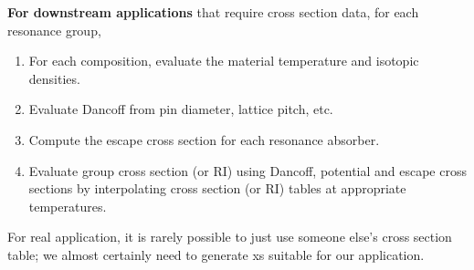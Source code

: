 \documentclass{school-22.211-notes}
\begin{document}
\textbf{For downstream applications} that require cross section data, for each resonance group,
\begin{enumerate}
\item For each composition, evaluate the material temperature and isotopic densities. 
\item Evaluate Dancoff from pin diameter, lattice pitch, etc. 
\item Compute the escape cross section for each resonance absorber.
\item Evaluate group cross section (or RI) using Dancoff, potential and escape cross sections by interpolating cross section (or RI) tables at appropriate temperatures. 
\end{enumerate}

For real application, it is rarely possible to just use someone else's cross section table; we almost certainly need to generate xs suitable for our application. 
\end{document}
